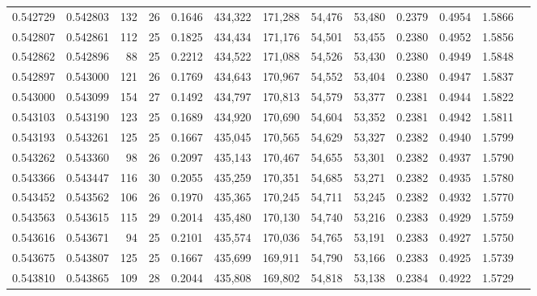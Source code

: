 \begin{tabular}{rrrrrrrrrrrrr}
0.542729 & 0.542803 & 132 &  26 &                                     0.1646 & 434,322 & 171,288 &  54,476 &  53,480 & 0.2379 & 0.4954 & 1.5866 \\
0.542807 & 0.542861 & 112 &  25 &                                     0.1825 & 434,434 & 171,176 &  54,501 &  53,455 & 0.2380 & 0.4952 & 1.5856 \\
0.542862 & 0.542896 &  88 &  25 &                                     0.2212 & 434,522 & 171,088 &  54,526 &  53,430 & 0.2380 & 0.4949 & 1.5848 \\
0.542897 & 0.543000 & 121 &  26 &                                     0.1769 & 434,643 & 170,967 &  54,552 &  53,404 & 0.2380 & 0.4947 & 1.5837 \\
0.543000 & 0.543099 & 154 &  27 &                                     0.1492 & 434,797 & 170,813 &  54,579 &  53,377 & 0.2381 & 0.4944 & 1.5822 \\
0.543103 & 0.543190 & 123 &  25 &                                     0.1689 & 434,920 & 170,690 &  54,604 &  53,352 & 0.2381 & 0.4942 & 1.5811 \\
0.543193 & 0.543261 & 125 &  25 &                                     0.1667 & 435,045 & 170,565 &  54,629 &  53,327 & 0.2382 & 0.4940 & 1.5799 \\
0.543262 & 0.543360 &  98 &  26 &                                     0.2097 & 435,143 & 170,467 &  54,655 &  53,301 & 0.2382 & 0.4937 & 1.5790 \\
0.543366 & 0.543447 & 116 &  30 &                                     0.2055 & 435,259 & 170,351 &  54,685 &  53,271 & 0.2382 & 0.4935 & 1.5780 \\
0.543452 & 0.543562 & 106 &  26 &                                     0.1970 & 435,365 & 170,245 &  54,711 &  53,245 & 0.2382 & 0.4932 & 1.5770 \\
0.543563 & 0.543615 & 115 &  29 &                                     0.2014 & 435,480 & 170,130 &  54,740 &  53,216 & 0.2383 & 0.4929 & 1.5759 \\
0.543616 & 0.543671 &  94 &  25 &                                     0.2101 & 435,574 & 170,036 &  54,765 &  53,191 & 0.2383 & 0.4927 & 1.5750 \\
0.543675 & 0.543807 & 125 &  25 &                                     0.1667 & 435,699 & 169,911 &  54,790 &  53,166 & 0.2383 & 0.4925 & 1.5739 \\
0.543810 & 0.543865 & 109 &  28 &                                     0.2044 & 435,808 & 169,802 &  54,818 &  53,138 & 0.2384 & 0.4922 & 1.5729 \\

\end{tabular}
